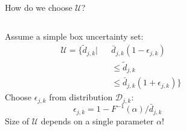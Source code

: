\documentclass[slides]{beamer}
\begin{document}
\begin{frame}{How do we choose $\mathcal{U}$?}
\begin{columns}
    \begin{column}{0.56\textwidth}
                Assume a simple box uncertainty set:
            \begin{equation*}
                \begin{aligned}
            &\mathcal{U} = \{\tilde{d}_{j,k}|&&\bar{d}_{j,k}(1-\epsilon_{j,k})\\
            &
            &&\leq \tilde{d}_{j,k}\\
            &
            &&\leq \bar{d}_{j,k}(1+\epsilon_{j,k})\}
            \end{aligned}
            \end{equation*}
            Choose $\epsilon_{j,k}$ from distribution $\mathcal{D}_{j,k}$:
            \begin{equation*}
            \epsilon_{j,k}= 1 - F^{-1}(\alpha)/\bar{d}_{j,k}
            \end{equation*}
            Size of $\mathcal{U}$ depends on a single parameter $\alpha$!
    \end{column}
    \begin{column}{0.42\textwidth}
        
    \end{column}
\end{columns}
\end{frame}
\end{document}
